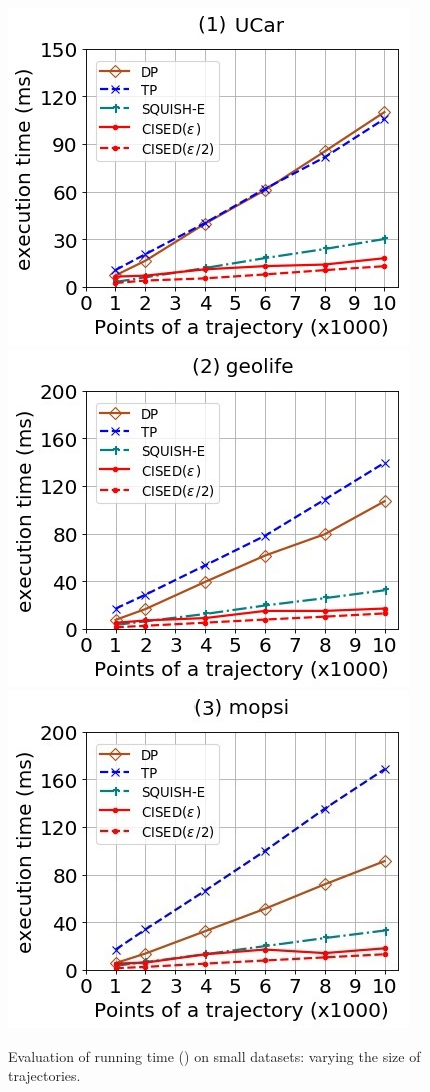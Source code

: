 \begin{figure}[tb!]
	\centering
	\includegraphics[scale=0.500]{Figures/Exp-SED-time-size-service.jpg}	\hspace{2ex}
	\includegraphics[scale=0.500]{Figures/Exp-SED-time-size-geolife.jpg}	\hspace{2ex}
	\includegraphics[scale=0.500]{Figures/Exp-SED-time-size-mopsi.jpg}	
	\vspace{-2ex}
	\caption{\small Evaluation of running time (\sed) on small datasets: varying the size of trajectories.}\label{fig:time-size-sed}
	\vspace{-2ex}
\end{figure}

